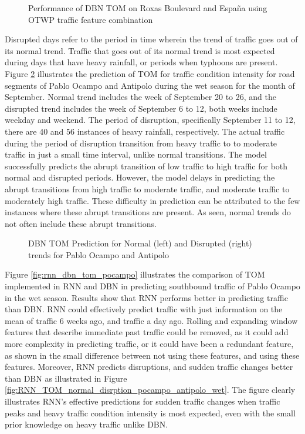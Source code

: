 \begin{figure}[h]
  \centering
  \captionsetup{justification=centering}
  \caption{Performance of DBN TOM on Roxas Boulevard and España using OTWP traffic feature combination}
  \label{fig:tom_feat_combi_road}
\end{figure}
 

Disrupted days refer to the period in time wherein the trend of traffic goes out of its normal trend. Traffic that goes out of its normal trend is most expected during days that have  heavy rainfall, or periods when typhoons are present. Figure \ref{fig:TOM_normal_disrption_pocampo_antipolo_wet} illustrates the prediction of TOM for traffic condition intensity for road segments of Pablo Ocampo and Antipolo during the wet season for the month of September. Normal trend includes the week of September 20 to 26, and the disrupted trend includes the week of September 6 to 12, both weeks include weekday and weekend. The period of disruption, specifically September 11 to 12, there are 40 and 56 instances of heavy rainfall, respectively. The actual traffic during the period of disruption transition from heavy traffic to to moderate traffic in just a small time interval, unlike normal transitions. The model successfully predicts the abrupt transition of low traffic to high traffic for both normal and disrupted periods. However, the model delays in predicting the abrupt transitions from high traffic to moderate traffic, and moderate traffic to moderately high traffic. These difficulty in prediction can be attributed to the few instances where these abrupt transitions are present. As seen, normal trends do not often include these abrupt transitions. 

\begin{figure}[h]
  \centering
  \captionsetup{justification=centering}
  \caption{DBN TOM Prediction for Normal (left) and Disrupted (right) trends for Pablo Ocampo and Antipolo}
  \label{fig:TOM_normal_disrption_pocampo_antipolo_wet}
\end{figure}

Figure \ref{fig:rnn_dbn_tom_pocampo} illustrates the comparison of TOM implemented in RNN and DBN in predicting southbound traffic of Pablo Ocampo in the wet season. Results show that RNN performs better in predicting traffic than DBN. RNN could effectively predict traffic with just information on the mean of traffic 6 weeks ago, and traffic a day ago. Rolling and expanding window features that describe immediate past traffic could be removed, as it could add more complexity in predicting traffic, or it could have been a redundant feature, as shown in the small difference between not using these features, and using these features. Moreover, RNN predicts disruptions, and sudden traffic changes better than DBN as illustrated in Figure \ref{fig:RNN_TOM_normal_disrption_pocampo_antipolo_wet}. The figure clearly illustrates RNN's effective predictions for sudden traffic changes when traffic peaks and heavy traffic condition intensity is most expected, even with the small prior knowledge on heavy traffic unlike DBN. 

